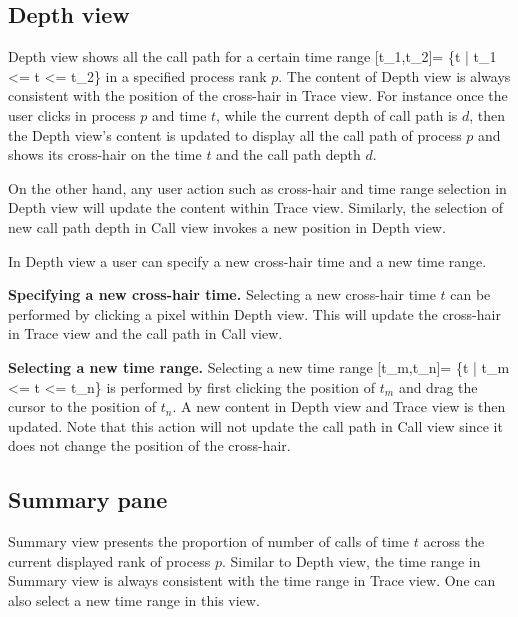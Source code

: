 \documentclass[english]{article}
\begin{document}
\subsection{Depth view}

Depth view shows all the call path for a certain time range [t_1,t_2]= \{t | t_1 <= t <= t_2\} in a specified process rank $p$. The content of Depth view is always consistent with the position of the cross-hair in Trace view.
For instance once the user clicks in process $p$ and time $t$, while the current depth of call path is $d$, then the Depth view's content is updated to display all the call path of process $p$ and shows its cross-hair on the time $t$ and the call path depth $d$.

On the other hand, any user action such as cross-hair and time range selection in Depth view will update the content within Trace view. Similarly, the selection of new call path depth in Call view invokes a new position in Depth view.

In Depth view a user can specify a new cross-hair time and a new time range.

\textbf{Specifying a new cross-hair time.} Selecting a new cross-hair time $t$ can be performed by clicking a pixel within Depth view. This will update the cross-hair in Trace view and the call path in Call view.

\textbf{Selecting a new time range.} Selecting a new time range [t_m,t_n]= \{t | t_m <= t <= t_n\} is performed by first clicking the position of $t_m$ and drag the cursor to the position of $t_n$. A new content in Depth view and Trace view is then updated. Note that this action will not update the call path in Call view since it does not change the position of the cross-hair.


\subsection{Summary pane}

Summary view presents the proportion of number of calls of time $t$ across the current displayed rank of process $p$.
Similar to Depth view, the time range in Summary view is always consistent with the time range in Trace view.
One can also select a new time range in this view.
\end{document}
